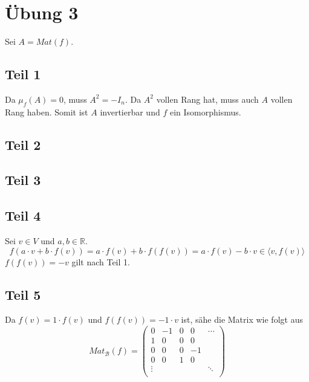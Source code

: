 \documentclass[10pt,a4paper]{article}
\begin{document}
\section*{Übung 3}

Sei $A = Mat(f)$.

\subsection*{Teil 1}

Da $\mu_{f}(A) = 0$, muss $A^{2} = -I_{n}$.
Da $A^{2}$ vollen Rang hat, muss auch $A$ vollen Rang haben.
Somit ist $A$ invertierbar und $f$ ein Isomorphismus.

\subsection*{Teil 2}

\subsection*{Teil 3}

\subsection*{Teil 4}

Sei $v \in V$ und $a, b \in \mathbb{R}$.
\begin{equation}
f(a \cdot v + b \cdot f(v)) = a \cdot f(v) + b \cdot f(f(v)) = a \cdot f(v) - b \cdot v \in \langle v, f(v) \rangle
\end{equation}
$f(f(v)) = -v$ gilt nach Teil 1.

\subsection*{Teil 5}

Da $f(v) = 1 \cdot f(v)$ und $f(f(v)) = -1 \cdot v$ ist, sähe die Matrix wie folgt aus
\begin{equation}
Mat_{\mathcal{B}}(f) = 
\begin{pmatrix}
0 & -1 & 0 & 0 & \cdots\\
1 & 0 & 0 & 0 & \\
0 & 0 & 0 & -1 & \\
0 & 0 & 1 & 0 & \\
\vdots &  &  &  & \ddots\\
\end{pmatrix}
\end{equation}
\end{document}
